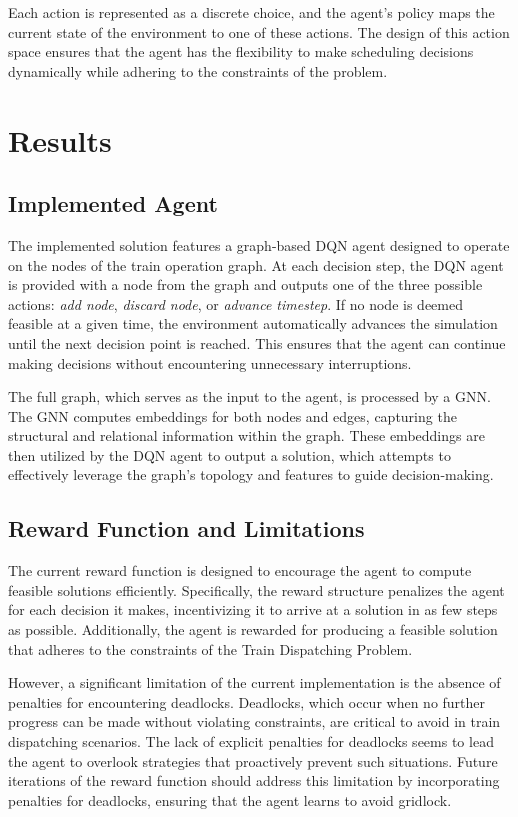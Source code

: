 \documentclass[runningheads]{llncs}
\begin{document}
Each action is represented as a discrete choice, and the agent's policy maps the current state of the environment to one of these actions. The design of this action space ensures that the agent has the flexibility to make scheduling decisions dynamically while adhering to the constraints of the problem.

\section{Results}
\label{sse:results}

\subsection{Implemented Agent}
The implemented solution features a graph-based DQN agent designed to operate on the nodes of the train operation graph. 
At each decision step, the DQN agent is provided with a node from the graph and outputs one of the three possible actions: \textit{add node}, \textit{discard node}, or \textit{advance timestep}. 
If no node is deemed feasible at a given time, the environment automatically advances the simulation until the next decision point is reached. 
This ensures that the agent can continue making decisions without encountering unnecessary interruptions.

The full graph, which serves as the input to the agent, is processed by a GNN. 
The GNN computes embeddings for both nodes and edges, capturing the structural and relational information within the graph. 
These embeddings are then utilized by the DQN agent to output a solution, which attempts to effectively leverage the graph's topology and features to guide decision-making.

\subsection{Reward Function and Limitations}
The current reward function is designed to encourage the agent to compute feasible solutions efficiently. 
Specifically, the reward structure penalizes the agent for each decision it makes, incentivizing it to arrive at a solution in as few steps as possible. Additionally, the agent is rewarded for producing a feasible solution that adheres to the constraints of the Train Dispatching Problem.

However, a significant limitation of the current implementation is the absence of penalties for encountering deadlocks. 
Deadlocks, which occur when no further progress can be made without violating constraints, are critical to avoid in train dispatching scenarios. 
The lack of explicit penalties for deadlocks seems to lead the agent to overlook strategies that proactively prevent such situations. 
Future iterations of the reward function should address this limitation by incorporating penalties for deadlocks, ensuring that the agent learns to avoid gridlock.
\end{document}
